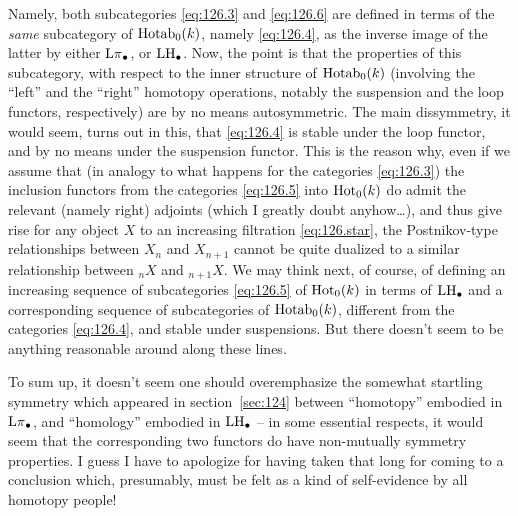 Namely, both subcategories \eqref{eq:126.3} and \eqref{eq:126.6} are
defined in terms of the \emph{same} subcategory of $\operatorname{Hotab}_0(k)$,
namely \eqref{eq:126.4}, as the inverse image of the
latter by either $\operatorname{L\pi}_\bullet$, or $\operatorname{LH}_\bullet$. Now, the point is
that the properties of this subcategory, with respect to the inner
structure of $\operatorname{Hotab}_0(k)$ (involving the ``left'' and the ``right''
homotopy operations, notably the suspension and the loop functors,
respectively) are by no means autosymmetric. The main dissymmetry, it
would seem, turns out in this, that \eqref{eq:126.4} is stable under
the loop functor, and by no means under the suspension functor. This
is the reason why, even if we assume that (in analogy to what happens
for the categories \eqref{eq:126.3}) the inclusion functors from the
categories \eqref{eq:126.5} into $\operatorname{Hot}_0(k)$ do admit the relevant
(namely right) adjoints (which I greatly doubt anyhow\dots), and thus
give rise for any object $X$ to an increasing filtration
\eqref{eq:126.star}, the Postnikov-type relationships between $X_n$
and $X_{n+1}$ cannot be quite dualized to a similar relationship
between ${}_nX$ and ${}_{n+1}X$. We may think next, of course, of
defining an increasing sequence of subcategories \eqref{eq:126.5} of
$\operatorname{Hot}_0(k)$ in terms of $\operatorname{LH}_\bullet$ and a corresponding sequence
of subcategories of $\operatorname{Hotab}_0(k)$, different from the categories
\eqref{eq:126.4}, and stable under suspensions. But there doesn't seem
to be anything reasonable around along these lines.

To sum up, it doesn't seem one should overemphasize the somewhat
startling symmetry which appeared in section~\ref{sec:124} between
``homotopy'' embodied in $\operatorname{L\pi}_\bullet$, and ``homology'' embodied in
$\operatorname{LH}_\bullet$ -- in some essential respects, it would seem that the
corresponding two functors do have non-mutually symmetry properties. I
guess I have to apologize for having taken that long for coming to a
conclusion which, presumably, must be felt as a kind of self-evidence
by all homotopy people!

